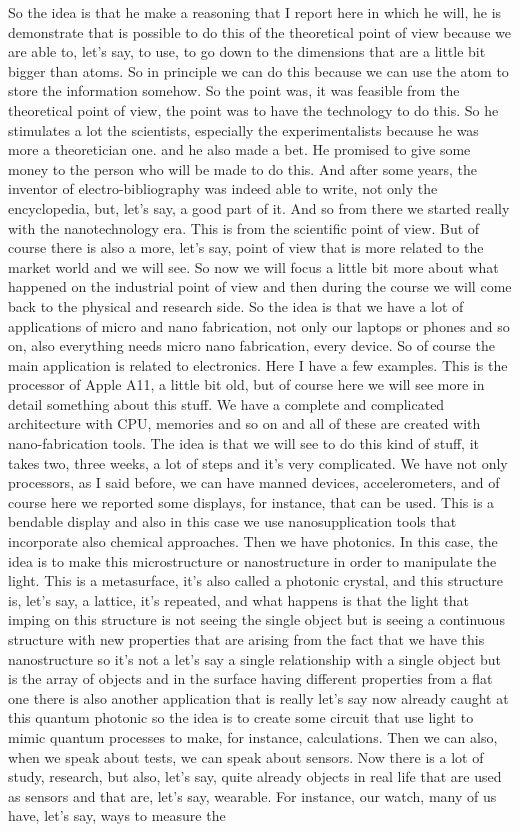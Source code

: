 So the idea is that he make a reasoning that I report here in which he will, he is demonstrate that is possible to do this of the theoretical point of view because we are able to, let's say, to use, to go down to the dimensions that are a little bit bigger than atoms. So in principle we can do this because we can use the atom to store the information somehow. So the point was, it was feasible from the theoretical point of view, the point was to have the technology to do this. So he stimulates a lot the scientists, especially the experimentalists because he was more a theoretician one. and he also made a bet. He promised to give some money to the person who will be made to do this. And after some years, the inventor of electro-bibliography was indeed able to write, not only the encyclopedia, but, let's say, a good part of it. And so from there we started really with the nanotechnology era. This is from the scientific point of view. But of course there is also a more, let's say, point of view that is more related to the market world and we will see. So now we will focus a little bit more about what happened on the industrial point of view and then during the course we will come back to the physical and research side. So the idea is that we have a lot of applications of micro and nano fabrication, not only our laptops or phones and so on, also everything needs micro nano fabrication, every device. So of course the main application is related to electronics. Here I have a few examples. This is the processor of Apple A11, a little bit old, but of course here we will see more in detail something about this stuff. We have a complete and complicated architecture with CPU, memories and so on and all of these are created with nano-fabrication tools. The idea is that we will see to do this kind of stuff, it takes two, three weeks, a lot of steps and it's very complicated. We have not only processors, as I said before, we can have manned devices, accelerometers, and of course here we reported some displays, for instance, that can be used. This is a bendable display and also in this case we use nanosupplication tools that incorporate also chemical approaches. Then we have photonics. In this case, the idea is to make this microstructure or nanostructure in order to manipulate the light. This is a metasurface, it's also called a photonic crystal, and this structure is, let's say, a lattice, it's repeated, and what happens is that the light that imping on this structure is not seeing the single object but is seeing a continuous structure with new properties that are arising from the fact that we have this nanostructure so it's not a let's say a single relationship with a single object but is the array of objects and in the surface having different properties from a flat one there is also another application that is really let's say now already caught at this quantum photonic so the idea is to create some circuit that use light to mimic quantum processes to make, for instance, calculations. Then we can also, when we speak about tests, we can speak about sensors. Now there is a lot of study, research, but also, let's say, quite already objects in real life that are used as sensors and that are, let's say, wearable. For instance, our watch, many of us have, let's say, ways to measure the 